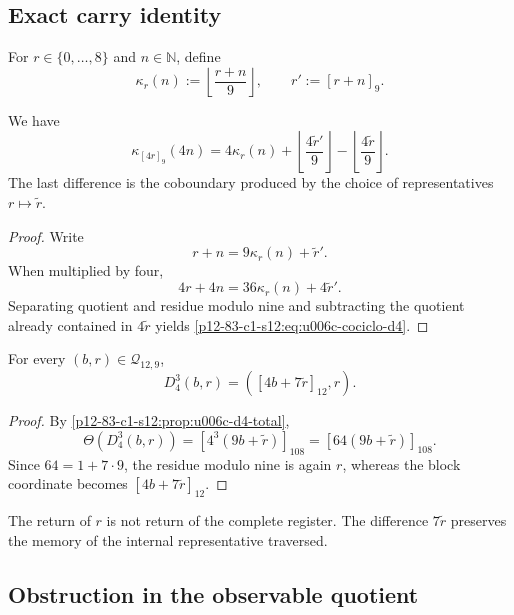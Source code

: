 \subsection{Exact carry identity}

For \(r\in\{0,\ldots,8\}\) and \(n\in\mathbb N\), define
\[
 \kappa_r(n):=\left\lfloor\frac{r+n}{9}\right\rfloor,
 \qquad
 r':=[r+n]_9.
\]

\begin{theorem}
\label{p12-83-c1-s12:thm:u006c-cociclo-d4}
We have
\begin{equation}
 \boxed{
 \kappa_{[4r]_9}(4n)
 =4\kappa_r(n)
 +\left\lfloor\frac{4\widetilde r'}{9}\right\rfloor
 -\left\lfloor\frac{4\widetilde r}{9}\right\rfloor.}
 \label{p12-83-c1-s12:eq:u006c-cociclo-d4}
\end{equation}
The last difference is the coboundary produced by the choice of
representatives \(r\mapsto\widetilde r\).
\end{theorem}

\begin{proof}
Write
\[
 r+n=9\kappa_r(n)+\widetilde r'.
\]
When multiplied by four,
\[
 4r+4n=36\kappa_r(n)+4\widetilde r'.
\]
Separating quotient and residue modulo nine and subtracting the quotient already contained in
\(4\widetilde r\) yields
\eqref{p12-83-c1-s12:eq:u006c-cociclo-d4}.
\end{proof}

\begin{corollary}
\label{p12-83-c1-s12:cor:u006c-tercera-iteracion}
For every \((b,r)\in\mathcal Q_{12,9}\),
\begin{equation}
 \boxed{D_4^3(b,r)=([4b+7\widetilde r]_{12},r).}
 \label{p12-83-c1-s12:eq:u006c-d4-cubo}
\end{equation}
\end{corollary}

\begin{proof}
By \cref{p12-83-c1-s12:prop:u006c-d4-total},
\[
 \Theta(D_4^3(b,r))
 =[4^3(9b+\widetilde r)]_{108}
 =[64(9b+\widetilde r)]_{108}.
\]
Since \(64=1+7\cdot9\), the residue modulo nine is again \(r\), whereas
the block coordinate becomes
\([4b+7\widetilde r]_{12}\).
\end{proof}

The return of \(r\) is not return of the complete register. The difference
\(7\widetilde r\) preserves the memory of the internal representative traversed.

\subsection{Obstruction in the observable quotient}

